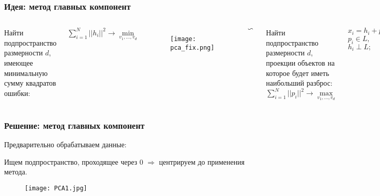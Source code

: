 \documentclass[10pt]{beamer}
\begin{document}
\begin{frame}
\frametitle{Идея: метод главных компонент}
 
\begin{columns}[t] %


Найти подпространство размерности $d$, имеющее минимальную сумму квадратов ошибки:

$\sum\limits_{i = 1}^{N} ||h_i||^2 \rightarrow \min\limits_{v_1, ..., v_d}$ 

\begin{figure}
\centering
        \texttt{[image: pca\_fix.png]}
\end{figure}

\vspace{\baselineskip}
$\backsim$


Найти подпространство размерности $d$, проекции объектов на которое будет иметь наибольший разброс:
$\sum\limits_{i = 1}^{N} ||p_i||^2 \rightarrow \max\limits_{v_1, ..., v_d}$ 

\vspace{\baselineskip}
\vspace{\baselineskip}
\vspace{\baselineskip}
$x_i = h_i + p_i,$  $p_i \in L,$ $h_i \perp L;$ 

$L = \ell (v_1, ..., v_d);$

$\widetilde{x_i} = p_i;$
\end{columns}


\end{frame}


\begin{frame}
\frametitle{Решение: метод главных компонент}

Предварительно обрабатываем данные: 

Ищем подпространство, проходящее через 0 $\Rightarrow$ центрируем до применения метода.
\begin{figure}
\centering
        \texttt{[image: PCA1.jpg]}
\end{figure}


\end{frame}
\end{document}
